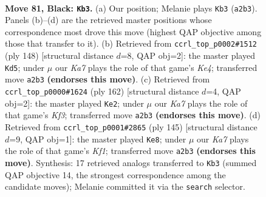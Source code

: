 \documentclass[11pt]{article}
\begin{document}
\clearpage

\begin{figure}[p]\centering
\begin{subfigure}{0.46\textwidth}\centering
\resizebox{\linewidth}{!}{%
\newchessgame
\chessboard[
  setfen={5Q1K/8/6q1/8/8/8/k7/8 b - - 3 81},
  showmover=false,
  pgfstyle=straightmove, color=movearrow, markmove={a2-b3}
]}
\caption{}
\end{subfigure}\hfill
\begin{subfigure}{0.46\textwidth}\centering
\resizebox{\linewidth}{!}{%
\newchessgame
\chessboard[
  setfen={5Q2/8/8/p7/P3K3/8/8/4k1q1 w - - 1 75},
  showmover=false,
  pgfstyle=straightmove, color=movearrow, markmove={e4-d5}
]}
\caption{}
\end{subfigure}
\\[4pt]
\begin{subfigure}{0.46\textwidth}\centering
\resizebox{\linewidth}{!}{%
\newchessgame
\chessboard[
  setfen={1Q6/8/8/8/8/5K1k/8/7q w - - 11 82},
  showmover=false,
  pgfstyle=straightmove, color=movearrow, markmove={f3-e2}
]}
\caption{}
\end{subfigure}\hfill
\begin{subfigure}{0.46\textwidth}\centering
\resizebox{\linewidth}{!}{%
\newchessgame
\chessboard[
  setfen={5k2/2Q5/1P6/8/8/6K1/4q3/8 b - - 2 73},
  showmover=false,
  pgfstyle=straightmove, color=movearrow, markmove={f8-e8}
]}
\caption{}
\end{subfigure}
\caption{\textbf{Move 81, Black: \texttt{Kb3}.} (a) Our position; Melanie plays \texttt{Kb3} (\texttt{a2b3}). Panels (b)--(d) are the retrieved master positions whose correspondence most drove this move (highest QAP objective among those that transfer to it). (b) Retrieved from \texttt{ccrl\_top\_p0002\#1512} (ply 148) [structural distance $d$=8, QAP obj=2]: the master played \texttt{Kd5}; under $\mu$ our \emph{Ka7} plays the role of that game's \emph{Ke4}; transferred move \texttt{a2b3} \textbf{(endorses this move)}. (c) Retrieved from \texttt{ccrl\_top\_p0000\#1624} (ply 162) [structural distance $d$=4, QAP obj=2]: the master played \texttt{Ke2}; under $\mu$ our \emph{Ka7} plays the role of that game's \emph{Kf3}; transferred move \texttt{a2b3} \textbf{(endorses this move)}. (d) Retrieved from \texttt{ccrl\_top\_p0001\#2865} (ply 145) [structural distance $d$=9, QAP obj=1]: the master played \texttt{Ke8}; under $\mu$ our \emph{Ka7} plays the role of that game's \emph{Kf1}; transferred move \texttt{a2b3} \textbf{(endorses this move)}. Synthesis: 17 retrieved analogs transferred to \texttt{Kb3} (summed QAP objective 14, the strongest correspondence among the candidate moves); Melanie committed it via the \texttt{search} selector.}
\label{fig:thought-m161}
\end{figure}
\end{document}
